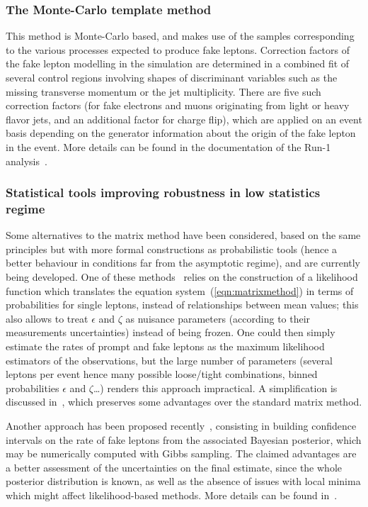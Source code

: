 \subsubsection{The Monte-Carlo template method}
\label{sec:bkg_fakes_mctemplates}

This method is Monte-Carlo based, and makes use of the samples corresponding to the various processes expected to produce fake leptons. 
Correction factors of the fake lepton modelling in the simulation are determined 
in a combined fit of several control regions involving shapes of discriminant variables such as the missing transverse momentum or the jet multiplicity. 
There are five such correction factors (for fake electrons and muons originating from light or heavy flavor jets, and an additional factor for charge flip), 
which are applied on an event basis depending on the generator information about the origin of the fake lepton in the event. 
More details can be found in the documentation of the Run-1 analysis~\cite{noteSS3L}. 

\subsubsection{Statistical tools improving robustness in low statistics regime}
\label{sec:bkg_fakes_stattools}

Some alternatives to the matrix method have been considered, based on the same principles but with more formal constructions as probabilistic tools 
(hence a better behaviour in conditions far from the asymptotic regime), and are currently being developed. 
One of these methods~\cite{PseudoLikelihoodMatrixMethod} relies on the construction of a likelihood function 
which translates the equation system~(\ref{eqn:matrixmethod}) in terms of probabilities for single leptons, instead of relationships between mean values; 
this also allows to treat $\epsilon$ and $\zeta$ as nuisance parameters (according to their measurements uncertainties) instead of being frozen. 
One could then simply estimate the rates of prompt and fake leptons as the maximum likelihood estimators of the observations, 
but the large number of parameters (several leptons per event hence many possible loose/tight combinations, binned probabilities $\epsilon$ and $\zeta$\ldots) 
renders this approach impractical. 
A simplification is discussed in~\cite{PseudoLikelihoodMatrixMethod,TomThesis}, which preserves some advantages over the standard matrix method. 

Another approach has been proposed recently~\cite{TomThesis}, 
consisting in building confidence intervals on the rate of fake leptons 
from the associated Bayesian posterior, which may be numerically computed with Gibbs sampling. 
The claimed advantages are a better assessment of the uncertainties on the final estimate, 
since the whole posterior distribution is known, 
as well as the absence of issues with local minima which might affect likelihood-based methods. 
More details can be found in~\cite{TomThesis}. 

